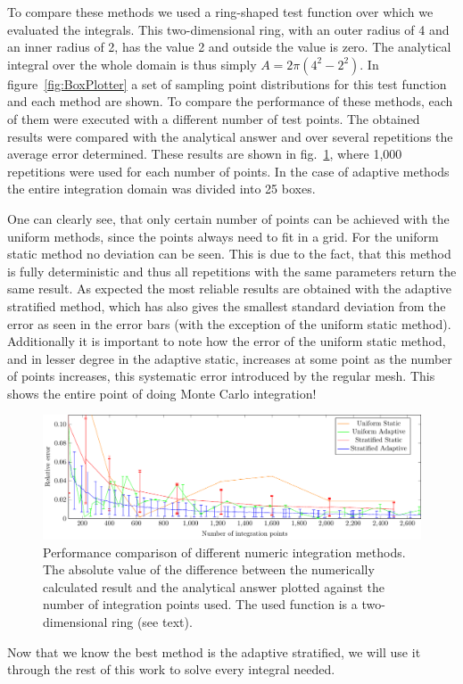 To compare these methods we used a ring-shaped test function over which we evaluated the integrals. This two-dimensional ring, with an outer radius of 4 and an inner radius of 2, has the value 2 and outside the value is zero. The analytical integral over the whole domain is thus simply $ A=2\pi (4^2-2^2)$.  In figure~\ref{fig:BoxPlotter} a set of sampling point distributions for this test function and each method are shown. To compare the performance of these methods, each of them were executed with a different number of test points. The obtained results were compared with the analytical answer and over several repetitions the average error determined. These results are shown in fig.~\ref{fig:MCerrs}, where 1,000 repetitions were used for each number of points. In the case of adaptive methods the entire integration domain was divided into 25 boxes.

One can clearly see, that only certain number of points can be achieved with the uniform methods, since the points always need to fit in a grid. For the uniform static method no deviation can be seen. This is due to the fact, that this method is fully deterministic and thus all repetitions with the same parameters return the same result.
As expected the most reliable results are obtained with the adaptive stratified method, which has also gives the smallest standard deviation from the error as seen in the error bars (with the exception of the uniform static method).
Additionally it is important to note how the error of the uniform static method, and in lesser degree in the adaptive static, increases at some point as the number of points increases, this systematic error introduced by the regular mesh. This shows the entire point of doing Monte Carlo integration!
\begin{figure}[th]
  \begin{center}
  \includegraphics[scale=0.9]{graphs/integration_test_ring.pdf}
  \caption{Performance comparison of different numeric integration methods. The absolute value of the difference between the numerically calculated result and the analytical answer plotted against the number of integration points used. The used function is a two-dimensional ring (see text).}
  \label{fig:MCerrs}
  \end{center}
\end{figure}

Now that we know the best method is the adaptive stratified, we will use it through the rest of this work to solve every integral needed.
